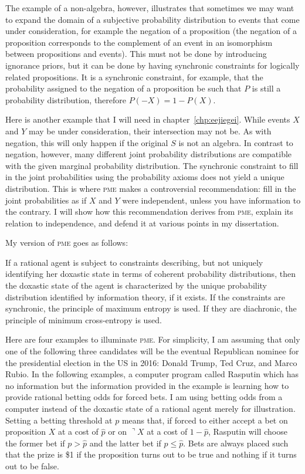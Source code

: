 \documentclass[phd,12pt,oneside]{ubcthesis}
\begin{document}
The example of a non-algebra, however, illustrates that sometimes we
may want to expand the domain of a subjective probability distribution
to events that come under consideration, for example the negation of a
proposition (the negation of a proposition corresponds to the
complement of an event in an isomorphism between propositions and
events). This must not be done by introducing ignorance priors, but it
can be done by having synchronic constraints for logically related
propositions. It is a synchronic constraint, for example, that the
probability assigned to the negation of a proposition be such that $P$
is still a probability distribution, therefore $P(-X)=1-P(X)$. 

Here is another example that I will need in
chapter~\ref{chp:eejiegei}. While events $X$ and $Y$ may be under
consideration, their intersection may not be. As with negation, this
will only happen if the original $S$ is not an algebra. In contrast to
negation, however, many different joint probability distributions are
compatible with the given marginal probability distribution. The
synchronic constraint to fill in the joint probabilities using the
probability axioms does not yield a unique distribution. This is where
\textsc{pme} makes a controversial recommendation: fill in the joint
probabilities as if $X$ and $Y$ were independent, unless you have
information to the contrary. I will show how this recommendation
derives from \textsc{pme}, explain its relation to independence, and
defend it at various points in my dissertation.

My version of \textsc{pme} goes as follows:

\begin{quotex}
  If a rational agent is subject to constraints describing, but not
  uniquely identifying her doxastic state in terms of coherent
  probability distributions, then the doxastic state of the agent is
  characterized by the unique probability distribution identified by
  information theory, if it exists. If the constraints are synchronic,
  the principle of maximum entropy is used. If they are diachronic,
  the principle of minimum cross-entropy is used.
\end{quotex}

Here are four examples to illuminate \textsc{pme}. For simplicity, I
am assuming that only one of the following three candidates will be
the eventual Republican nominee for the presidential election in the
US in 2016: Donald Trump, Ted Cruz, and Marco Rubio. In the following
examples, a computer program called Rasputin which has no information
but the information provided in the example is learning how to provide
rational betting odds for forced bets. I am using betting odds from a
computer instead of the doxastic state of a rational agent merely for
illustration. Setting a betting threshold at $p$ means that, if forced
to either accept a bet on proposition $X$ at a cost of $\hat{p}$ or on
$\urcorner{}X$ at a cost of $1-\hat{p}$, Rasputin will choose the
former bet if $p>\hat{p}$ and the latter bet if $p\leq\hat{p}$. Bets
are always placed such that the prize is \$1 if the proposition turns
out to be true and nothing if it turns out to be false.
\end{document}

